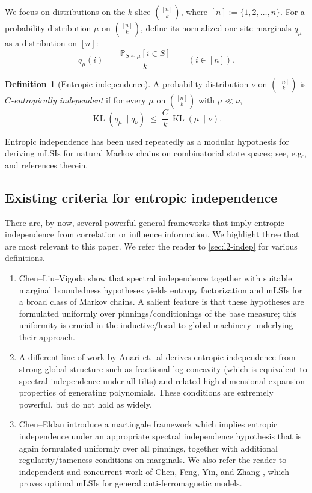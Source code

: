 \documentclass[11pt,reqno,letterpaper]{amsart}
\renewcommand{\P}{\mathbb{P}}
\numberwithin{equation}{section}
\theoremstyle{definition}
\newtheorem{definition}[theorem]{Definition}
\newcommand{\KL}{\operatorname{KL}}
\begin{document}
We focus on distributions on the $k$-slice $\binom{[n]}{k}$, where $[n]:=\{1,2,\dots,n\}$.
For a probability distribution $\mu$ on $\binom{[n]}{k}$, define its normalized one-site marginals
$q_\mu$ as a distribution on $[n]$:
\[
q_{\mu}(i) \;=\; \frac{\P_{S\sim \mu}[i \in S]}{k}
\qquad(i\in[n]).
\]

\begin{definition}[Entropic independence]
\label{def:entropic-independence-intro}
A probability distribution $\nu$ on $\binom{[n]}{k}$ is \emph{$C$-entropically independent} if for every
$\mu$ on $\binom{[n]}{k}$ with $\mu\ll \nu$,
\[
\KL(q_{\mu} \| q_{\nu}) \;\le\; \frac{C}{k}\,\KL(\mu \| \nu).
\]
\end{definition}

Entropic independence has been used repeatedly as a modular hypothesis for deriving mLSIs for natural Markov chains on combinatorial state spaces; see, e.g.,
\cite{ChenLiuVigoda2021, anari2021entropic, anari2021entropic2} and references therein.

\subsection{Existing criteria for entropic independence}

There are, by now, several powerful general frameworks that imply entropic independence from
correlation or influence information. We highlight three that are most relevant to this paper. We refer the reader to \cref{sec:l2-indep} for various definitions. 

\begin{enumerate}
\item Chen--Liu--Vigoda \cite{ChenLiuVigoda2021} show that {spectral independence} together with suitable {marginal
boundedness} hypotheses yields entropy factorization and mLSIs for a broad class of Markov chains.
A salient feature is that these hypotheses are formulated {uniformly over pinnings/conditionings} of the
base measure; this uniformity is crucial in the inductive/local-to-global machinery underlying their approach.

\item A different line of work by Anari et.~al \cite{anari2021entropic,anari2021entropic2} derives entropic
independence from strong global structure such as fractional log-concavity (which is equivalent to spectral independence under all tilts) and related
high-dimensional expansion properties of generating polynomials. These conditions are extremely powerful, but do not hold as widely. 

\item Chen--Eldan \cite{chen2022localization} introduce a martingale framework which implies entropic independence
under an appropriate spectral independence hypothesis that is again formulated {uniformly over all pinnings}, together
with additional regularity/tameness conditions on marginals. We also refer the reader to independent and concurrent work of Chen, Feng, Yin, and Zhang \cite{Chen2022OptimalMF}, which proves optimal mLSIs for general anti-ferromagnetic models. 
\end{enumerate}
\end{document}
